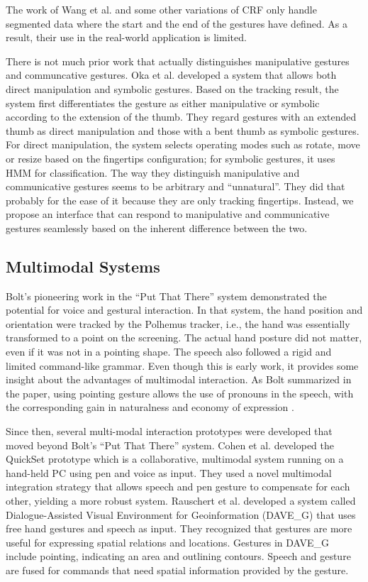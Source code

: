 The work of Wang et al. and some other variations of CRF only handle segmented
data where the start and the end of the gestures have defined. As a result,
their use in the real-world application is limited.

\cite{song12}

There is not much prior work that actually distinguishes manipulative gestures
and communcative gestures. Oka et al. \cite{Oka02} developed a system that allows
both direct manipulation and symbolic gestures. Based on the tracking result,
the system first differentiates the gesture as either manipulative or symbolic 
according to the extension of the thumb. They regard gestures with an extended 
thumb as direct manipulation and those with a bent thumb as symbolic gestures. 
For direct manipulation, the system selects operating modes such as rotate, 
move or resize based on the fingertips configuration; for symbolic gestures, it 
uses HMM for classification. The way they distinguish manipulative and 
communicative gestures seems to be arbitrary and ``unnatural''. They did that 
probably for the ease of it because they are only tracking fingertips.
Instead, we propose an interface that can respond to manipulative and
communicative gestures seamlessly based on the inherent difference between the two.

\subsection{Multimodal Systems}
Bolt's pioneering work in the ``Put That There'' system \cite{Bolt80} 
demonstrated the potential for voice and gestural interaction.  In that system, 
the hand position and orientation were tracked by the Polhemus tracker, i.e.,
the hand was essentially transformed to a point on the screening. The actual hand 
posture did not matter, even if it was not in a pointing shape. The speech also 
followed a rigid and limited command-like grammar. Even though this is early 
work, it provides some insight about the advantages of multimodal interaction. 
As Bolt summarized in the paper, using pointing gesture allows the use of 
pronouns in the speech, with the corresponding gain in naturalness and economy 
of expression \cite{Bolt80}.

Since then, several multi-modal interaction prototypes were 
developed that moved beyond Bolt's ``Put That There'' system. Cohen et al. 
\cite{Cohen97} developed the QuickSet prototype which is a collaborative, 
multimodal system running on a hand-held PC using pen and voice as input. They 
used a novel multimodal integration strategy that allows speech and pen gesture 
to compensate for each other, yielding a more robust system. Rauschert et al. 
\cite{Rauschert02} developed a system called Dialogue-Assisted Visual 
Environment for Geoinformation (DAVE\_G) that uses free hand gestures and speech
as input. They recognized that gestures are more useful for expressing spatial 
relations and locations. Gestures in DAVE\_G include pointing, indicating an 
area and outlining contours. Speech and gesture are fused for commands that need
spatial information provided by the gesture. 

